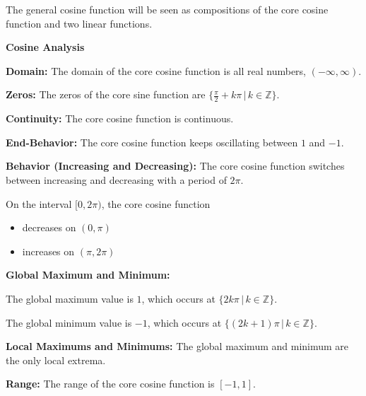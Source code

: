 \documentclass{ximera}
\begin{document}
The general cosine function will be seen as compositions of the core cosine function and two linear functions.





\begin{summary} \textbf{\textcolor{red!70!yellow}{Cosine Analysis}}


\textbf{Domain:} The domain of the core cosine function is all real numbers, $(-\infty, \infty)$. 

\textbf{Zeros:} The zeros of the core sine function are $\{ \frac{\pi}{2}  + k\pi \, | \, k \in \mathbb{Z} \}$.

\textbf{Continuity:} The core cosine function is continuous.

\textbf{End-Behavior:} The core cosine function keeps oscillating between $1$ and $-1$.



\textbf{Behavior (Increasing and Decreasing):} The core cosine function switches between increasing and decreasing with a period of $2\pi$.

On the interval $[0 , 2\pi)$, the core cosine function

\begin{itemize}
\item decreases on $(0, \pi)$
\item increases on $(\pi, 2\pi)$
\end{itemize}








\textbf{Global Maximum and Minimum:} 

The global maximum value is $1$, which occurs at $\{ 2k\pi \, | \, k \in \mathbb{Z} \}$.


The global minimum value is $-1$, which occurs at $\{  (2k+1)\pi \, | \, k \in \mathbb{Z} \}$.




\textbf{Local Maximums and Minimums:}  The global maximum and minimum are the only local extrema.




\textbf{Range:} The range of the core cosine function is $[-1, 1]$.


\end{summary}
\end{document}
